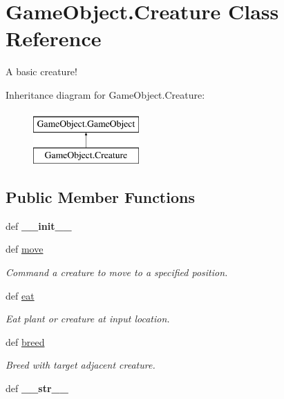 \hypertarget{classGameObject_1_1Creature}{\section{\-Game\-Object.\-Creature \-Class \-Reference}
\label{classGameObject_1_1Creature}
}


\-A basic creature!  


\-Inheritance diagram for \-Game\-Object.\-Creature\-:\begin{figure}[H]
\begin{center}
\leavevmode
\includegraphics[height=2.000000cm]{classGameObject_1_1Creature}
\end{center}
\end{figure}
\subsection*{\-Public \-Member \-Functions}
\begin{DoxyCompactItemize}
\item 
\hypertarget{classGameObject_1_1Creature_a9f4759d9f7747709e6923ec5c2e636df}{def {\bfseries \-\_\-\-\_\-init\-\_\-\-\_\-}}\label{classGameObject_1_1Creature_a9f4759d9f7747709e6923ec5c2e636df}

\item 
\hypertarget{classGameObject_1_1Creature_a0673907e5e7244b71344ba351a1bddb5}{def \hyperlink{classGameObject_1_1Creature_a0673907e5e7244b71344ba351a1bddb5}{move}}\label{classGameObject_1_1Creature_a0673907e5e7244b71344ba351a1bddb5}

\begin{DoxyCompactList}\small\item\em \-Command a creature to move to a specified position. \end{DoxyCompactList}\item 
\hypertarget{classGameObject_1_1Creature_ae3a2ede34db2a80f422fe53a5ba8b70f}{def \hyperlink{classGameObject_1_1Creature_ae3a2ede34db2a80f422fe53a5ba8b70f}{eat}}\label{classGameObject_1_1Creature_ae3a2ede34db2a80f422fe53a5ba8b70f}

\begin{DoxyCompactList}\small\item\em \-Eat plant or creature at input location. \end{DoxyCompactList}\item 
def \hyperlink{classGameObject_1_1Creature_acc83da415fc0d749a6ccfbab49c35774}{breed}
\begin{DoxyCompactList}\small\item\em \-Breed with target adjacent creature. \end{DoxyCompactList}\item 
\hypertarget{classGameObject_1_1Creature_ae0e09f288eab88b19d1ce5aaed5c00e5}{def {\bfseries \-\_\-\-\_\-str\-\_\-\-\_\-}}\label{classGameObject_1_1Creature_ae0e09f288eab88b19d1ce5aaed5c00e5}

\end{DoxyCompactItemize}
